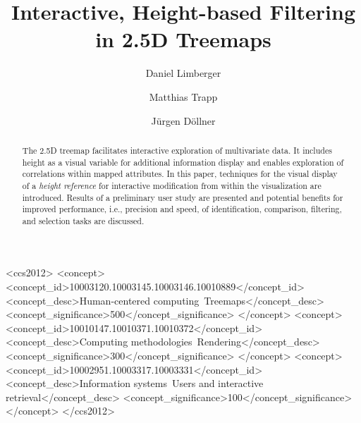 \documentclass[sigconf]{acmart}
\begin{document}
\title{Interactive, Height-based Filtering in 2.5D Treemaps}

\author{Daniel Limberger}
\author{Matthias Trapp}
\author{J\"{u}rgen D\"{o}llner}

\begin{abstract}
The 2.5D treemap facilitates interactive exploration of multivariate data. 
It includes height as a visual variable for additional information display and enables exploration of correlations within mapped attributes. 
In this paper, techniques for the visual display of a \emph{height reference} for interactive modification from within the visualization are introduced.
Results of a preliminary user study are presented and potential benefits for improved performance, i.e., precision and speed, of identification, comparison, filtering, and selection tasks are discussed.
\end{abstract}

\begin{CCSXML}
<ccs2012>
<concept>
<concept_id>10003120.10003145.10003146.10010889</concept_id>
<concept_desc>Human-centered computing~Treemaps</concept_desc>
<concept_significance>500</concept_significance>
</concept>
<concept>
<concept_id>10010147.10010371.10010372</concept_id>
<concept_desc>Computing methodologies~Rendering</concept_desc>
<concept_significance>300</concept_significance>
</concept>
<concept>
<concept_id>10002951.10003317.10003331</concept_id>
<concept_desc>Information systems~Users and interactive retrieval</concept_desc>
<concept_significance>100</concept_significance>
</concept>
</ccs2012>
\end{CCSXML}


\end{document}
